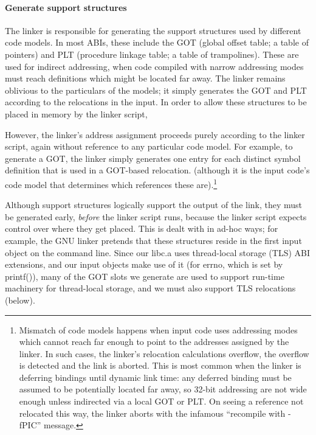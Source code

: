 \paragraph{Generate support structures}
The linker is responsible for generating the support structures used by different code models.
In most ABIs, these include the GOT (global offset table; a table of pointers) and PLT 
(procedure linkage table; a table of trampolines).
These are used for indirect addressing, when code compiled with narrow addressing modes
must reach definitions which might be located far away.
The linker remains oblivious to the particulars of the models;
it simply generates the GOT and PLT according to the relocations in the input.
In order to allow these structures to be placed in memory by the linker script, 

However, the linker's address assignment proceeds purely according to the linker script, 
again without reference to any particular code model.
For example, to generate a GOT, the linker simply generates one entry 
for each distinct symbol definition that is used in a GOT-based relocation.
(although it is the input code's code model that determines which references these are).\footnote{Mismatch 
of code models happens when input code uses addressing modes which cannot reach far enough 
to point to the addresses assigned by the linker.
In such cases, the linker's relocation calculations overflow, the overflow is detected
and the link is aborted.
This is most common when the linker is deferring bindings until dynamic link time: 
any deferred binding must be assumed to be potentially located far away,
so 32-bit addressing are not wide enough unless indirected via a local GOT or PLT.
On seeing a reference not relocated this way, 
the linker aborts with the infamous ``recompile with \textsf{-fPIC}'' message.}

Although support structures logically support the output of the link, 
they must be generated early, \emph{before} the linker script runs, 
because the linker script expects control over where they get placed.
This is dealt with in ad-hoc ways; for example, the GNU linker
pretends that these structures reside in the first input object on the command line.
Since our \textsf{libc.a} uses thread-local storage (TLS) ABI extensions,
and our input objects make use of it (for \textsf{errno}, which is set by \textsf{printf()}),
many of the GOT slots we generate are used to support run-time machinery for thread-local storage,
and we must also support TLS relocations (below).

